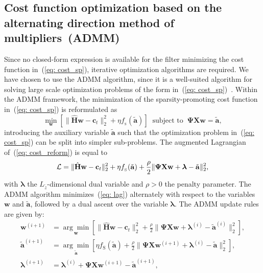 \documentclass{article}
\begin{document}
\subsection{Cost function optimization based on the alternating direction method of multipliers~(ADMM)}
Since no closed-form expression is available for the filter minimizing the cost function in~(\ref{eq: cost_sp}), iterative optimization algorithms are required.
We have chosen to use the ADMM algorithm, since it is a well-suited algorithm for solving large scale optimization problems of the form in~(\ref{eq: cost_sp})~\cite{Boyd_admm_2011}.
Within the ADMM framework, the minimization of the sparsity-promoting cost function in~(\ref{eq: cost_sp}) is reformulated as
\begin{equation}
\label{eq: cost_reform}
\min_{\mathbf{w}} \left[ \|\hat{\mathbf{H}}\mathbf{w}-\mathbf{c}_t \|_2^2 + \eta f_{_{\text{S}}}(\tilde{\mathbf{a}}) \right] \; \; {\text{subject to}} \; \; \boldsymbol{\Psi}\mathbf{X}\mathbf{w} = \tilde{\mathbf{a}},
\end{equation}
introducing the auxiliary variable $\tilde{\mathbf{a}}$ such that the optimization problem in~(\ref{eq: cost_sp}) can be split into simpler sub-problems.
The augmented Lagrangian of~(\ref{eq: cost_reform}) is equal to
\begin{equation}
\label{eq: lag}
{\cal{L}} = \|\hat{\mathbf{H}}\mathbf{w}-\mathbf{c}_t \|_2^2 + \eta f_{_{\text{S}}}(\tilde{\mathbf{a}}) + \frac{\rho}{2} \|\boldsymbol{\Psi}\mathbf{X}\mathbf{w} +\boldsymbol{\lambda} - \tilde{\mathbf{a}}\|_2^2,
\end{equation}
with $\boldsymbol{\lambda}$ the $L_{\tilde{z}}$-dimensional dual variable and $\rho>0$ the penalty parameter.
The ADMM algorithm minimizes~(\ref{eq: lag}) alternately with respect to the variables $\mathbf{w}$ and $\tilde{\mathbf{a}}$, followed by a dual ascent over the variable $\boldsymbol{\lambda}$.
The ADMM update rules are given by:
{\small{\begin{align}
\label{eq: upw}
\!\!\mathbf{w}^{(i+1)} & \!=\! \underset{\mathbf{w}}{\arg\min} \left[\|\hat{\mathbf{H}}\mathbf{w} \!-\! \mathbf{c}_t\|_2^2  \!+\! \frac{\rho}{2} \|\mathbf{\Psi}\mathbf{X}\mathbf{w} \!+\! \boldsymbol{\lambda}^{(i)} \!-\! \tilde{\mathbf{a}}^{(i)} \|_2^2 \right]\!\!, \!\!\! \\
\label{eq: upz}
\!\!\tilde{\mathbf{a}}^{(i+1)} & \!=\! \underset{\tilde{\mathbf{a}}}{\arg\min} \left[ \eta f_{\text{S}}(\tilde{\mathbf{a}}) \!+\! \frac{\rho}{2} \|\mathbf{\Psi}\mathbf{X}\mathbf{w}^{(i+1)} \!+\! \boldsymbol{\lambda}^{(i)} \!-\! \tilde{\mathbf{a}} \|_2^2 \right]\!\!, \\
\label{eq: up_lambda_sls}
\boldsymbol{\lambda}^{(i+1)} & \!=\! \boldsymbol{\lambda}^{(i)} \!+\! \mathbf{\Psi}\mathbf{X}\mathbf{w}^{(i+1)} \!-\! \tilde{\mathbf{a}}^{(i+1)},
\end{align}}}%
\end{document}
